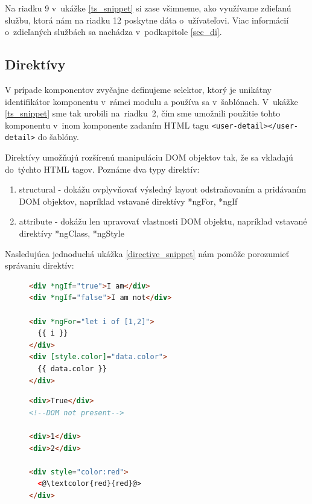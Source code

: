 \documentclass[
  printed, %
  twoside, %
  notable,   %
  nolof,   %
  nolot,   %
]{fithesis3}
\begin{document}
Na riadku 9 v~ukážke \ref{ts_snippet} si zase všimneme, ako využívame zdieľanú službu, ktorá nám na riadku 12 poskytne dáta o~užívateľovi. Viac informácií o~zdieľaných službách sa nachádza v~podkapitole \ref{sec_di}.

\subsection{Direktívy}
\label{sec_directives}
V prípade komponentov zvyčajne definujeme selektor, ktorý je unikátny identifikátor komponentu v~rámci modulu a používa sa v~šablónach. V~ukážke \ref{ts_snippet} sme tak urobili na~riadku~2, čím sme umožnili použitie tohto komponentu v~inom komponente zadaním HTML tagu \texttt{<user-detail></user-detail>} do šablóny.

Direktívy umožňujú rozšírenú manipuláciu DOM objektov tak, že sa vkladajú do~týchto HTML tagov. Poznáme dva typy direktív\cite{angular}:
\begin{enumerate}
\item structural - dokážu ovplyvňovať výsledný layout odstraňovaním a pridávaním DOM objektov, napríklad vstavané direktívy *ngFor, *ngIf
\item attribute - dokážu len upravovať vlastnosti DOM objektu, napríklad vstavané direktívy *ngClass, *ngStyle
\end{enumerate}

Nasledujúca jednoduchá ukážka \ref{directive_snippet} nám pomôže porozumieť správaniu direktív:
\begin{figure}[H]
 \centering
 \begin{minipage}{.59\textwidth}

  \centering
  \begin{lstlisting}[language=HTML,caption={Direktívy použité v šalóne (vľavo) a ako ich vo~výsledku vníma prehliadač (vpravo)},label=directive_snippet]
<div *ngIf="true">I am</div>
<div *ngIf="false">I am not</div>

<div *ngFor="let i of [1,2]">
  {{ i }}
</div>
<div [style.color]="data.color">
  {{ data.color }}
</div>
  \end{lstlisting}

 \end{minipage}
 \begin{minipage}{.39\textwidth}

  \centering
  \begin{lstlisting}[language=HTML,numbers=none,xleftmargin=0em]
<div>True</div>
<!--DOM not present-->

<div>1</div>
<div>2</div>

<div style="color:red">
  <@\textcolor{red}{red}@>
</div>
  \end{lstlisting}
 
 \end{minipage}
\end{figure}
\end{document}
